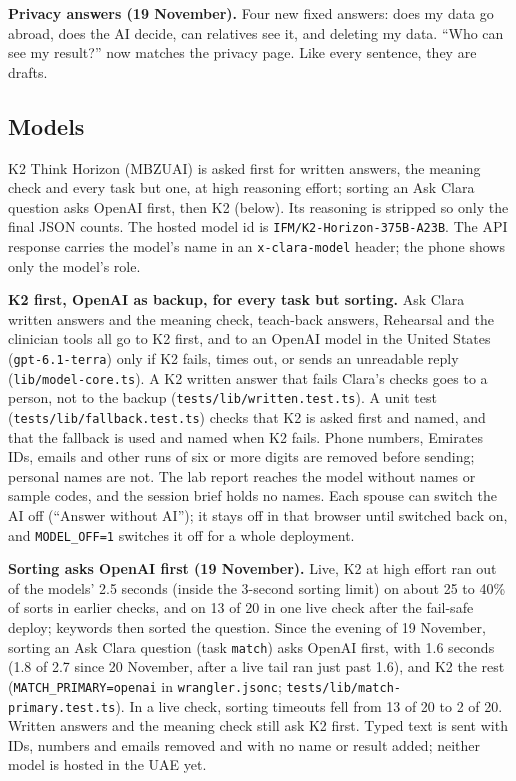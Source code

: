 \documentclass[10.5pt,a4paper]{article}
\newcommand{\code}[1]{\texttt{\small #1}}
\newcommand{\file}[1]{\leavevmode\textcolor{muted}{\texttt{\small #1}}}
\begin{document}
\textbf{Privacy answers (19 November).} Four new fixed answers: does my data go abroad, does the AI decide, can
relatives see it, and deleting my data. ``Who can see my result?'' now matches the privacy page. Like every sentence,
they are drafts.

\subsection{Models}

K2 Think Horizon (MBZUAI) is asked first for written answers, the meaning check and every task but one, at high
reasoning effort; sorting an Ask Clara question asks OpenAI first, then K2 (below). Its reasoning is stripped so only the final JSON
counts. The hosted model id is \code{IFM/K2-Horizon-375B-A23B}. The API response carries the model's name in an
\code{x-clara-model} header; the phone shows only the model's role.

\textbf{K2 first, OpenAI as backup, for every task but sorting.} Ask Clara written answers and the meaning check,
teach-back answers, Rehearsal and the clinician tools all go to K2 first, and to an OpenAI model in the United States (\code{gpt-6.1-terra}) only if K2
fails, times out, or sends an unreadable reply (\file{lib/model-core.ts}). A K2 written answer that fails Clara's checks
goes to a person, not to the backup (\file{tests/lib/written.test.ts}). A unit test (\file{tests/lib/fallback.test.ts}) checks that K2 is asked first and named, and that the
fallback is used and named when K2 fails. Phone numbers, Emirates IDs, emails and other runs of six or more digits are
removed before sending; personal names are not. The lab report reaches the model without names or sample codes, and
the session brief holds no names. Each spouse can switch the AI off (``Answer without AI''); it stays off in that
browser until switched back on, and \code{MODEL\_OFF=1} switches it off for a whole deployment.

\textbf{Sorting asks OpenAI first (19 November).} Live, K2 at high effort ran out of the models' 2.5 seconds (inside the 3-second sorting limit) on about
25 to 40\% of sorts in earlier checks, and on 13 of 20 in one live check after the fail-safe deploy; keywords then sorted the question. Since the evening of
19 November, sorting an Ask Clara question (task \code{match}) asks OpenAI first, with 1.6 seconds (1.8 of 2.7 since 20 November, after a live tail ran just past 1.6), and K2 the rest
(\code{MATCH\_PRIMARY=openai} in \file{wrangler.jsonc}; \file{tests/lib/match-primary.test.ts}). In a live check,
sorting timeouts fell from 13 of 20 to 2 of 20. Written answers and the meaning check still ask K2 first. Typed text is
sent with IDs, numbers and emails removed and with no name or result added; neither model is hosted in the UAE yet.
\end{document}
